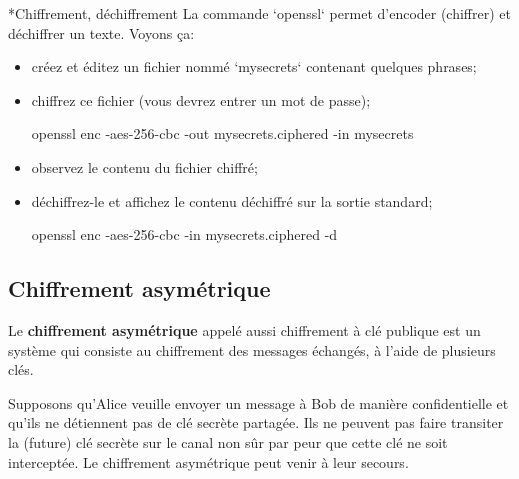 \documentclass[a4paper,11pt]{article}
\begin{document}
\bigskip
\begin{Exercice}*{Chiffrement, déchiffrement}    
    La commande `openssl` permet d'encoder (chiffrer) et déchiffrer un texte.
    Voyons ça:
	
	\begin{itemize}
    	\item créez et éditez un fichier nommé `mysecrets` contenant quelques 
    		phrases;
    
    	\item chiffrez ce fichier (vous devrez entrer un mot de passe);

			\begin{term}
			openssl enc -aes-256-cbc -out mysecrets.ciphered
			   -in mysecrets
			\end{term}

		\item observez le contenu du fichier chiffré;

			\pagebreak
		\item déchiffrez-le et affichez le contenu déchiffré sur la sortie 
			standard;
			
			\begin{term}
			openssl enc -aes-256-cbc -in mysecrets.ciphered -d
	        \end{term}
	
	\end{itemize}

\end{Exercice}




\subsection{Chiffrement asymétrique}
\label{chiffrement-asymétrique}

Le \textbf{chiffrement asymétrique} appelé aussi chiffrement à clé publique est
un système qui consiste au chiffrement des messages échangés, à l'aide de
plusieurs clés. 

Supposons qu'Alice veuille envoyer un message à Bob de manière confidentielle et
qu'ils ne détiennent pas de clé secrète partagée. Ils ne peuvent pas faire
transiter la (future) clé secrète sur le canal non sûr par peur que cette clé ne
soit interceptée. Le chiffrement asymétrique peut venir à leur secours. 
\end{document}
